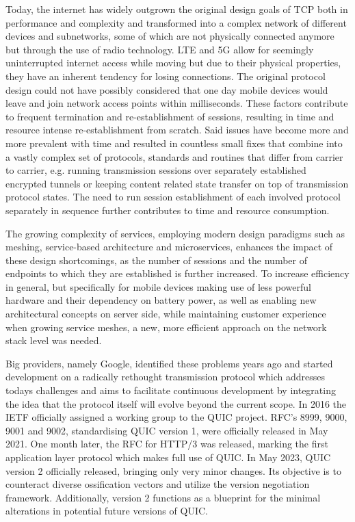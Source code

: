 Today, the internet has widely outgrown the original design goals of TCP both in performance and complexity and transformed into a complex network of different devices and subnetworks, some of which are not physically connected anymore but through the use of radio technology. LTE and 5G allow for seemingly uninterrupted internet access while moving but due to their physical properties, they have an inherent tendency for losing connections. The original protocol design could not have possibly considered that one day mobile devices would leave and join network access points within milliseconds. These factors contribute to frequent termination and re-establishment of sessions, resulting in time and resource intense re-establishment from scratch. Said issues have become more and more prevalent with time and resulted in countless small fixes that combine into a vastly complex set of protocols, standards and routines that differ from carrier to carrier, e.g. running transmission sessions over separately established encrypted tunnels or keeping content related state transfer on top of transmission protocol states. The need to run session establishment of each involved protocol separately in sequence further contributes to time and resource consumption.

The growing complexity of services, employing modern design paradigms such as meshing, service-based architecture and microservices, enhances the impact of these design shortcomings, as the number of sessions and the number of endpoints to which they are established is further increased. To increase efficiency in general, but specifically for mobile devices making use of less powerful hardware and their dependency on battery power, as well as enabling new architectural concepts on server side, while maintaining customer experience when growing service meshes, a new, more efficient approach on the network stack level was needed.

Big providers, namely Google, identified these problems years ago and started development on a radically rethought transmission protocol which addresses todays challenges and aims to facilitate continuous development by integrating the idea that the protocol itself will evolve beyond the current scope. In 2016 the IETF officially assigned a working group to the QUIC project\cite{quic_wg_history}. RFC's 8999\cite{rfc8999}, 9000\cite{rfc9000}, 9001\cite{rfc9001} and 9002\cite{rfc9002}, standardising QUIC version 1, were officially released in May 2021. One month later, the RFC for HTTP/3 was released, marking the first application layer protocol which makes full use of QUIC\cite{rfc9114}. In May 2023, QUIC version 2 officially released, bringing only very minor changes\cite{rfc9369}. Its objective is to counteract diverse ossification vectors and utilize the version negotiation framework. Additionally, version 2 functions as a blueprint for the minimal alterations in potential future versions of QUIC.

